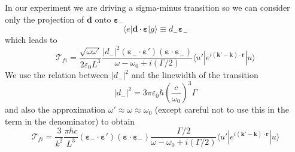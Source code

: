 \documentclass[11pt,letter]{article}
\newcommand{\bv}[1]{\ensuremath{\bm{#1}}}
\begin{document}
In our experiment we are driving a sigma-minus transition so we can consider only the projection of $\bv{d}$ onto $\bv{\varepsilon}_{-}$ 
\begin{equation}
     \langle e | \bv{d} \cdot \bv{\varepsilon} | g \rangle  \equiv
     d_{-} \bv{\varepsilon}_{-} 
\end{equation} 
which leads to 
\begin{equation}
    \mathcal{T}_{fi}  = 
    \frac{\sqrt{\omega \omega'}}{2\varepsilon_{0} L^{3}}
    \frac{ |d_{-}|^{2}  (\bv{\varepsilon}_{-}\cdot \bv{\varepsilon}' )
                       (\bv{\varepsilon}\cdot \bv{\varepsilon}_{-} )}
        { \omega - \omega_{0} + i (\Gamma/2 ) }
      \langle u' | e^{i(\bv{k}'-\bv{k}) \cdot\bv{r}} | u  \rangle
\end{equation}
We use the relation between $|d_{-}|^{2}$ and the linewidth of the transition
\begin{equation} 
    |d_{-}|^{2} =  3\pi \varepsilon_{0} \hbar
  \left( \frac{c}{\omega_{0}} \right)^{3}  \Gamma
\end{equation}
and also the approximation $\omega' \approx \omega \approx \omega_{0}$ (except
careful not to use this in the term in the denominator) to obtain
\begin{equation}
    \mathcal{T}_{fi} =
    \frac{ 3 } {k^{2}} 
    \frac{ \pi \hbar c } {  L^{3} } 
        (\bv{\varepsilon}_{-}\cdot \bv{\varepsilon}' )
                       (\bv{\varepsilon}\cdot \bv{\varepsilon}_{-} )
    \frac{ \Gamma/2  }
        { \omega - \omega_{0} + i (\Gamma/2 ) }
      \langle u' | e^{i(\bv{k}'-\bv{k}) \cdot\bv{r}} | u  \rangle
\end{equation}
\end{document}
